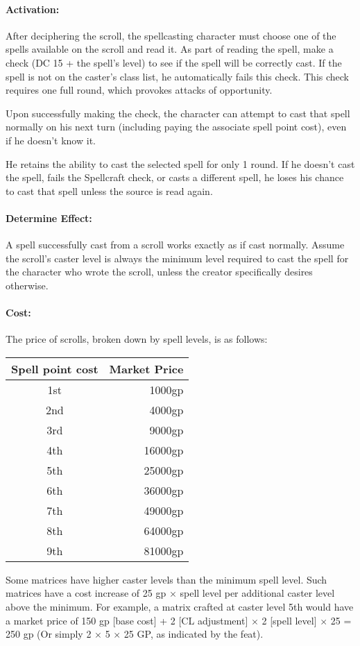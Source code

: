 \paragraph{Activation:} 
After deciphering the scroll, the spellcasting character must choose one of the spells available on the scroll and read it.
As part of reading the spell, make a  check  (DC 15 + the spell's level) to see if the spell will be correctly cast. 
If the spell is not on the caster's class list, he automatically fails this check.
This check requires one full round, which provokes attacks of opportunity.

Upon successfully making the check, the character can attempt to cast that spell normally on his next turn (including paying the associate spell point cost), even if he doesn't know it.
 
He retains the ability to cast the selected spell for only 1 round. 
If he doesn't cast the spell, fails the Spellcraft check, or casts a different spell, 
he loses his chance to cast that spell unless the source is read again.

\paragraph{Determine Effect:} 
A spell successfully cast from a scroll works exactly as if cast normally. 
Assume the scroll's caster level is always the minimum level required to cast the spell for the character who wrote the scroll, unless the creator specifically desires otherwise.

\paragraph{Cost:}
The price of scrolls, broken down by spell levels, is as follows:
\begin{center}
\begin{tabular}{|c|r|}
\hline
\textbf{Spell point cost}&\textbf{Market Price}\\
\hline
1st&	1000gp\\
2nd&	4000gp\\
3rd&	9000gp\\
4th&	16000gp\\
5th&	25000gp\\
6th&	36000gp\\
7th&	49000gp\\
8th&	64000gp\\
9th&	81000gp\\
\hline
\end{tabular}
\end{center}
Some matrices have higher caster levels than the minimum spell level. Such matrices have a cost increase of 25 gp $\times$ spell level per additional caster level above the minimum. For example, a  matrix crafted at caster level 5th would have a market price of 150 gp [base cost] + 2 [CL adjustment] $\times$ 2 [spell level] $\times$ 25 = 250 gp (Or simply 2 $\times$ 5 $\times$ 25 GP, as indicated by the  feat).

